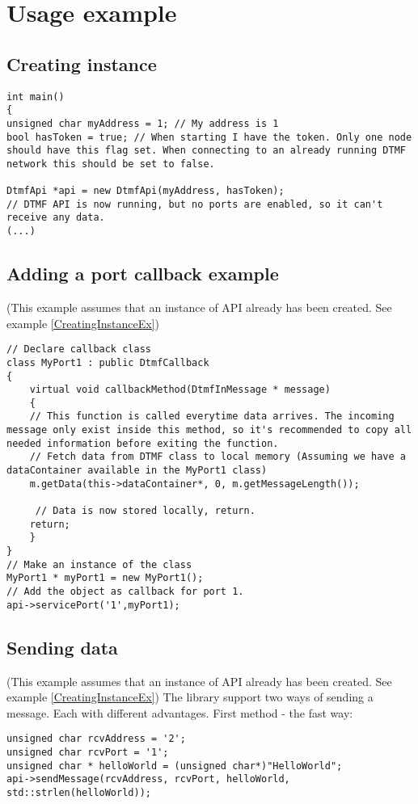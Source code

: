 \chapter{Usage example}
\label{app:usageexample}
\section{Creating instance}
\begin{lstlisting}[float=htb,language={[ANSI]C++},caption={Creating instance example},label=CreatingInstanceEx]
int main()
{
unsigned char myAddress = 1; // My address is 1
bool hasToken = true; // When starting I have the token. Only one node should have this flag set. When connecting to an already running DTMF network this should be set to false.

DtmfApi *api = new DtmfApi(myAddress, hasToken);
// DTMF API is now running, but no ports are enabled, so it can't receive any data.
(...)
\end{lstlisting}

\section{Adding a port callback example}
(This example assumes that an instance of API already has been created. See example \ref{CreatingInstanceEx})
\begin{lstlisting}[float=htb,language={[ANSI]C++},caption={Adding a port callback example},label=CreatingCallbackEx]
// Declare callback class
class MyPort1 : public DtmfCallback
{
	virtual void callbackMethod(DtmfInMessage * message)
	{
    // This function is called everytime data arrives. The incoming message only exist inside this method, so it's recommended to copy all needed information before exiting the function.
    // Fetch data from DTMF class to local memory (Assuming we have a dataContainer available in the MyPort1 class)
    m.getData(this->dataContainer*, 0, m.getMessageLength());
    
     // Data is now stored locally, return.
    return;
	}
}
// Make an instance of the class
MyPort1 * myPort1 = new MyPort1();
// Add the object as callback for port 1.
api->servicePort('1',myPort1);
\end{lstlisting}


\section{Sending data}
(This example assumes that an instance of API already has been created. See example \ref{CreatingInstanceEx})
The library support two ways of sending a message. Each with different advantages.
First method - the fast way:
\begin{lstlisting}[float=htb,language={[ANSI]C++},caption={Sending data example 1},label=SendingDataEx1]
unsigned char rcvAddress = '2';
unsigned char rcvPort = '1';
unsigned char * helloWorld = (unsigned char*)"HelloWorld";
api->sendMessage(rcvAddress, rcvPort, helloWorld, std::strlen(helloWorld));
\end{lstlisting}

